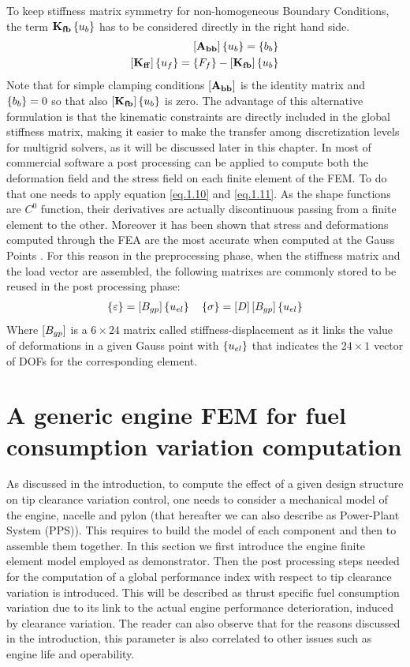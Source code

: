 To keep stiffness matrix symmetry for non-homogeneous Boundary Conditions, the term  $\mathbf{K_{fb}}\left\lbrace{u_b}\right \rbrace$ has to be considered directly in the right hand side.
\begin{eqnarray}
\label{eq.1.17s}
\left[{\mathbf{A_{bb}}}\right]\left\lbrace{u_b}\right \rbrace=\left\lbrace{b_b}\right \rbrace\\
\label{eq.1.18s}
\left[{\mathbf{K_{ff}}}\right]\left\lbrace{u_f}\right \rbrace=\left\lbrace{F_f}\right \rbrace-\left[{\mathbf{K_{fb}}}\right]\left\lbrace{u_b}\right \rbrace
\end{eqnarray}
Note that for simple clamping conditions $\left[{\mathbf{A_{bb}}}\right]$ is the identity matrix and $\left\lbrace{b_b}\right \rbrace=0$  so that also $\left[{\mathbf{K_{fb}}}\right]\left\lbrace{u_b}\right \rbrace$ is zero.
The advantage of this alternative formulation is that the kinematic constraints are directly included in the global stiffness matrix, making it easier to make the transfer among discretization levels for multigrid solvers, as it will be discussed later in this chapter.
In most of commercial software a post processing can be applied to compute both the deformation field and the stress field on each finite element of the FEM. To do that one needs to apply equation \ref{eq.1.10} and \ref{eq.1.11}. As the shape functions are $C^0$ function, their derivatives are actually discontinuous passing from a finite element to the other. Moreover it has been shown that stress and deformations computed through the FEA are the most accurate when computed at the Gauss Points \cite{zlamal1978superconvergence,zhang2006natural}. For this reason in the preprocessing phase, when the stiffness matrix and the load vector are assembled, the following matrixes are commonly stored to be reused in the post processing phase:
\begin{eqnarray}
\label{eq.1.40}
	\left\lbrace{\varepsilon}\right \rbrace=\left[{B_{gp}}\right]\left\lbrace{u_{el}}\right \rbrace \quad
	\left\lbrace{\sigma}\right \rbrace=\left[{D}\right]\left[{B_{gp}}\right]\left\lbrace{u_{el}}\right \rbrace
\end{eqnarray}
Where $\left[{B_{gp}}\right]$ is a $6\times 24$ matrix called stiffness-displacement as it links the value of deformations in a given Gauss point with $\left\lbrace{u_{el}}\right \rbrace$ that indicates the $24\times1$ vector of DOFs for the corresponding element.
\section{A generic engine FEM for fuel consumption variation computation}
As discussed in the introduction, to compute the effect of a given design structure on tip clearance variation control, one needs to consider a mechanical model of the engine, nacelle and pylon (that hereafter we can also describe as Power-Plant System (PPS)). This requires to build the model of each component and then to assemble them together.
In this section we first introduce the engine finite element model employed as demonstrator. Then the post processing steps needed for the computation of a global performance index with respect to tip clearance variation is introduced. This will be described as thrust specific fuel consumption variation due to its link to the actual engine performance deterioration, induced by clearance variation. The reader can also observe that for the reasons discussed in the introduction, this parameter is also correlated to other issues such as engine life and operability.
